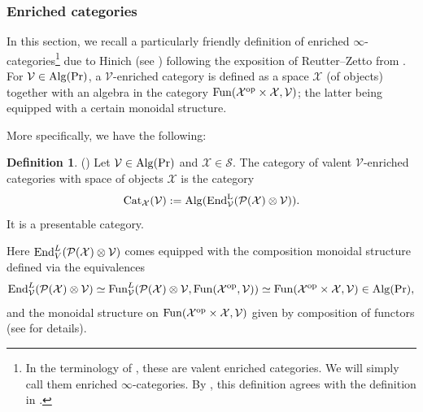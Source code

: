 \documentclass[10pt]{amsart}
\theoremstyle{definition}
\newtheorem{definition}[equation]{Definition}
\theoremstyle{remark}
\newcommand{\LL}{\operatorname{L} }
\newcommand{\sv}{{\mathcal{V}}}
\newcommand{\sx}{{\mathcal{X}}}
\newcommand{\sss}{{\mathcal{S}}}
\newcommand{\spp}{{\mathcal{P}}}
\numberwithin{equation}{section}
\numberwithin{equation}{section}
\begin{document}
   \subsubsection{Enriched categories} In this section, we recall a particularly friendly definition of enriched $\infty$-categories\footnote{In the terminology of \cite{RZ},
these are valent enriched categories. We will simply call them
enriched \(\infty\)-categories. By  \cite[Prop. 4.5.3]{Hin20}, \cite{Mac21}  this definition agrees with the definition in
\cite{GH15}.}
due to Hinich (see  \cite{Hin20}) following the exposition of  Reutter--Zetto from \cite[Sec. 2.4]{RZ}. For  $\sv \in {\rm  Alg}({\rm Pr})$,  a $\sv$-enriched category is defined 
as a space $\sx$ (of objects) together with an algebra in the category ${\rm Fun}(\sx^{\rm op} \times  \sx, \sv)$; the latter being 
equipped with a certain  monoidal structure.

   More specifically, we have the following: 
 \begin{definition}(\cite[Prop. 4.5.3]{Hin20}) \label{def2} Let $\sv\in {\rm  Alg}({\rm Pr})$ and $\sx \in  \sss$. The category of
valent  $\sv$-enriched categories with space of objects $\sx$ is the category
$${\rm Cat}_{\sx}(\sv) := {\rm Alg}({\rm End}^{\LL}_{\sv}(\spp(\sx) \otimes \sv)) .$$
It is a presentable category. 
\end{definition}
Here  ${\rm End}^L_V(\spp(\sx) \otimes  \sv) $ comes equipped with the composition monoidal structure defined via the equivalences
\begin{equation}\label{kicius1}{\rm End}^L_{\sv}(\spp(\sx) \otimes \sv) \simeq {\rm Fun}^L_{\sv}(\spp(\sx) \otimes \sv,{\rm Fun}(\sx^{\rm op}, \sv))\simeq  
{\rm Fun}(\sx^{\rm op} \times  \sx, \sv) \in  {\rm Alg}({\rm Pr}),
\end{equation}
and the  monoidal structure on ${\rm Fun}(\sx^{\rm op} \times  \sx, \sv)$ given by composition of functors (see \cite[Cor. 2.29]{RZ} for details).
\end{document}
